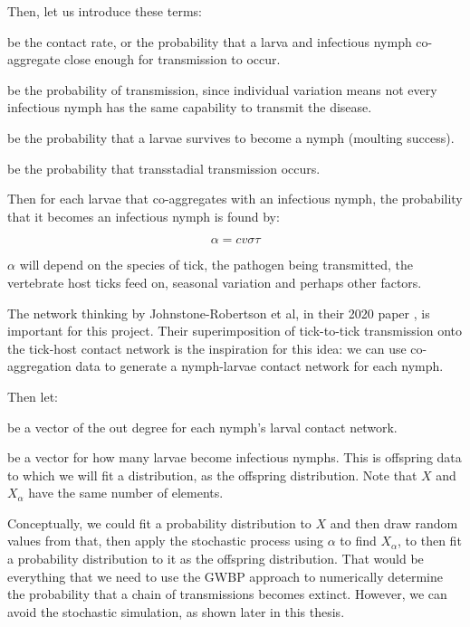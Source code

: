 \documentclass{article}
\begin{document}
Then, let us introduce these terms:

\begin{description}[leftmargin=1cm, style=nextline]
    \item[$ c $] be the contact rate, or the probability that a larva and infectious nymph co-aggregate close enough for transmission to occur.
    \item[$ v $] be the probability of transmission, since individual variation means not every infectious nymph has the same capability to transmit the disease.
    \item[$ \sigma $] be the probability that a larvae survives to become a nymph (moulting success).
    \item[$ \tau $] be the probability that transstadial transmission occurs.
\end{description}

Then for each larvae that co-aggregates with an infectious nymph, the probability that it becomes an infectious nymph is found by:

\begin{equation} \label{alphaDef}
    \alpha = c v \sigma \tau
\end{equation}

$ \alpha $ will depend on the species of tick, the pathogen being transmitted, the vertebrate host ticks feed on, seasonal variation and perhaps other factors.

The network thinking by Johnstone-Robertson et al, in their 2020 paper \cite{JohnstoneRobertson2020}, is important for this project. Their superimposition of tick-to-tick transmission onto the tick-host contact network is the inspiration for this idea: we can use co-aggregation data to generate a nymph-larvae contact network for each nymph.

Then let:
\begin{description}[leftmargin=1cm, style=nextline]
    \item[$ X $] be a vector of the out degree for each nymph's larval contact network.
    \item[$ X_\alpha $] be a vector for how many larvae become infectious nymphs. This is offspring data to which we will fit a distribution, as the offspring distribution. Note that $ X $ and $ X_\alpha $ have the same number of elements. 
\end{description}

Conceptually, we could fit a probability distribution to $ X $ and then draw random values from that, then apply the stochastic process using $ \alpha $ to find $ X_\alpha $, to then fit a probability  distribution to it as the offspring distribution. That would be everything that we need to use the GWBP approach to numerically determine the probability that a chain of transmissions becomes extinct. However, we can avoid the stochastic simulation, as shown  later in this thesis.
\end{document}
